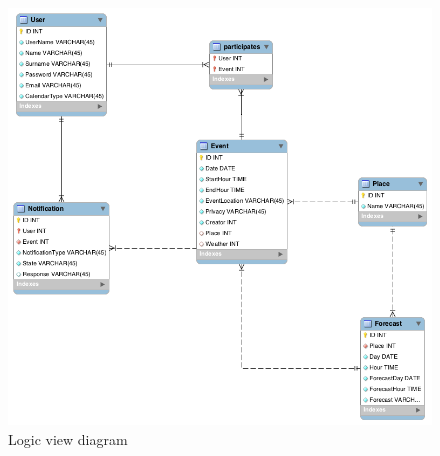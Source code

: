 \documentclass[10pt,a4paper,titlepage]{article}
\begin{document}
\begin{figure}[p]
\centering
\includegraphics[width=\linewidth]{./images/Logic_view}
\caption[Logic view]{Logic view diagram}
\label{fig:Logic_view}
\end{figure}

\clearpage
\end{document}
